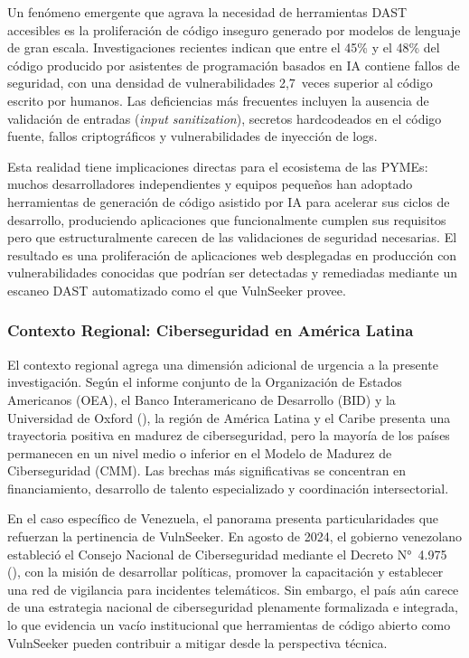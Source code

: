 \documentclass[12pt, a4paper]{article}
\begin{document}
Un fenómeno emergente que agrava la necesidad de herramientas DAST accesibles
es la proliferación de código inseguro generado por modelos de lenguaje de
gran escala. Investigaciones recientes indican que entre el 45\% y el 48\%
del código producido por asistentes de programación basados en IA contiene
fallos de seguridad, con una densidad de vulnerabilidades 2,7~veces superior
al código escrito por humanos. Las deficiencias más frecuentes incluyen la
ausencia de validación de entradas (\textit{input sanitization}), secretos
hardcodeados en el código fuente, fallos criptográficos y vulnerabilidades
de inyección de logs.

Esta realidad tiene implicaciones directas para el ecosistema de las PYMEs:
muchos desarrolladores independientes y equipos pequeños han adoptado
herramientas de generación de código asistido por IA para acelerar sus
ciclos de desarrollo, produciendo aplicaciones que funcionalmente cumplen
sus requisitos pero que estructuralmente carecen de las validaciones de
seguridad necesarias. El resultado es una proliferación de aplicaciones
web desplegadas en producción con vulnerabilidades conocidas que podrían
ser detectadas y remediadas mediante un escaneo DAST automatizado como el
que VulnSeeker provee.

\subsubsection{Contexto Regional: Ciberseguridad en América Latina}

El contexto regional agrega una dimensión adicional de urgencia a la
presente investigación. Según el informe conjunto de la Organización de
Estados Americanos (OEA), el Banco Interamericano de Desarrollo (BID) y
la Universidad de Oxford (\cite{oasidb2025}), la región de América Latina
y el Caribe presenta una trayectoria positiva en madurez de ciberseguridad,
pero la mayoría de los países permanecen en un nivel medio o inferior en
el Modelo de Madurez de Ciberseguridad (CMM). Las brechas más significativas
se concentran en financiamiento, desarrollo de talento especializado y
coordinación intersectorial.

En el caso específico de Venezuela, el panorama presenta particularidades
que refuerzan la pertinencia de VulnSeeker. En agosto de 2024, el gobierno
venezolano estableció el Consejo Nacional de Ciberseguridad mediante el
Decreto N°~4.975 (\cite{venezuelacyber2024}), con la misión de desarrollar
políticas, promover la capacitación y establecer una red de vigilancia para
incidentes telemáticos. Sin embargo, el país aún carece de una estrategia
nacional de ciberseguridad plenamente formalizada e integrada, lo que
evidencia un vacío institucional que herramientas de código abierto como
VulnSeeker pueden contribuir a mitigar desde la perspectiva técnica.
\end{document}
